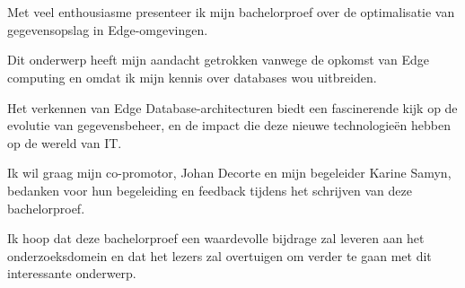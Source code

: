 
\chapter*{}%
\label{ch:voorwoord}


Met veel enthousiasme presenteer ik mijn bachelorproef over de optimalisatie van gegevensopslag in Edge-omgevingen.

Dit onderwerp heeft mijn aandacht getrokken vanwege de opkomst van Edge computing en omdat ik mijn kennis over databases wou uitbreiden.

Het verkennen van Edge Database-architecturen biedt een fascinerende kijk op de evolutie van gegevensbeheer, en de impact die deze nieuwe technologieën hebben op de wereld van IT.

Ik wil graag mijn co-promotor, Johan Decorte en mijn begeleider Karine Samyn, bedanken voor hun begeleiding en feedback tijdens het schrijven van deze bachelorproef.

Ik hoop dat deze bachelorproef een waardevolle bijdrage zal leveren aan het onderzoeksdomein en dat het lezers zal overtuigen om verder te gaan met dit interessante onderwerp.